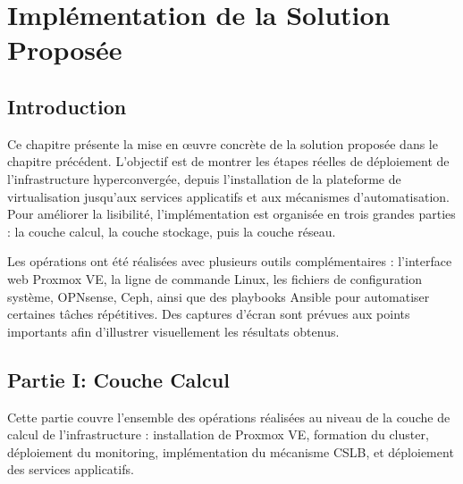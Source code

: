 
\chapter{Implémentation de la Solution Proposée}
\thispagestyle{empty}
\newpage


\section{Introduction}

\par Ce chapitre présente la mise en œuvre concrète de la solution proposée dans le chapitre précédent. L'objectif est de montrer les étapes réelles de déploiement de l'infrastructure hyperconvergée, depuis l'installation de la plateforme de virtualisation jusqu'aux services applicatifs et aux mécanismes d'automatisation. Pour améliorer la lisibilité, l'implémentation est organisée en trois grandes parties : la couche calcul, la couche stockage, puis la couche réseau.\\

\par Les opérations ont été réalisées avec plusieurs outils complémentaires : l'interface web Proxmox VE, la ligne de commande Linux, les fichiers de configuration système, OPNsense, Ceph, ainsi que des playbooks Ansible pour automatiser certaines tâches répétitives. Des captures d'écran sont prévues aux points importants afin d'illustrer visuellement les résultats obtenus.\\

\section{Partie I: Couche Calcul}

\par Cette partie couvre l'ensemble des opérations réalisées au niveau de la couche de calcul de l'infrastructure : installation de Proxmox VE, formation du cluster, déploiement du monitoring, implémentation du mécanisme CSLB, et déploiement des services applicatifs.

